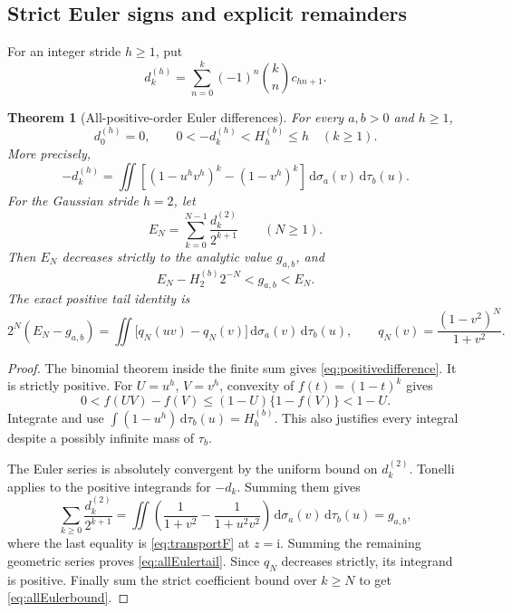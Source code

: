 \documentclass[11pt]{article}
\numberwithin{equation}{section}
\newtheorem{theorem}{Theorem}[section]
\theoremstyle{definition}
\theoremstyle{remark}
\newcommand{\dd}{\,\mathrm d}
\newcommand{\ii}{\mathrm i}
\begin{document}
\subsection{Strict Euler signs and explicit remainders}
For an integer stride $h\ge1$, put
\begin{equation}\label{eq:dk}
 d_k^{(h)}=\sum_{n=0}^k(-1)^n\binom kn c_{hn+1}.
\end{equation}
\begin{theorem}[All-positive-order Euler differences]\label{thm:Eulerall}
For every $a,b>0$ and $h\ge1$,
\begin{equation}\label{eq:differencebound}
 d_0^{(h)}=0,\qquad
 0<-d_k^{(h)}<H_h^{(b)}\le h\quad(k\ge1).
\end{equation}
More precisely,
\begin{equation}\label{eq:positivedifference}
 -d_k^{(h)}=\iint\left[(1-u^hv^h)^k-(1-v^h)^k\right]
                    \dd\sigma_a(v)\dd\tau_b(u).
\end{equation}
For the Gaussian stride $h=2$, let
\begin{equation}\label{eq:EN}
 E_N=\sum_{k=0}^{N-1}\frac{d_k^{(2)}}{2^{k+1}}\qquad(N\ge1).
\end{equation}
Then $E_N$ decreases strictly to the analytic value $g_{a,b}$, and
\begin{equation}\label{eq:allEulerbound}
 E_N-H_2^{(b)}2^{-N}<g_{a,b}<E_N.
\end{equation}
The exact positive tail identity is
\begin{equation}\label{eq:allEulertail}
 2^N(E_N-g_{a,b})
 =\iint\bigl[q_N(uv)-q_N(v)\bigr]
                    \dd\sigma_a(v)\dd\tau_b(u),
 \qquad q_N(v)=\frac{(1-v^2)^N}{1+v^2}.
\end{equation}
\end{theorem}
\begin{proof}
The binomial theorem inside the finite sum gives
\eqref{eq:positivedifference}. It is strictly positive.
For $U=u^h$, $V=v^h$, convexity of $f(t)=(1-t)^k$ gives
\[
 0<f(UV)-f(V)\le(1-U)\{1-f(V)\}<1-U.
\]
Integrate and use
$\int(1-u^h)\dd\tau_b(u)=H_h^{(b)}$. This also justifies every
integral despite a possibly infinite mass of $\tau_b$.

The Euler series is absolutely convergent by the uniform bound on
$d_k^{(2)}$. Tonelli applies to the positive integrands for $-d_k$.
Summing them gives
\[
 \sum_{k\ge0}\frac{d_k^{(2)}}{2^{k+1}}
 =\iint\left(\frac1{1+v^2}-\frac1{1+u^2v^2}\right)
                  \dd\sigma_a(v)\dd\tau_b(u)
 =g_{a,b},
\]
where the last equality is \eqref{eq:transportF} at $z=\ii$.
Summing the remaining geometric series proves
\eqref{eq:allEulertail}. Since $q_N$ decreases strictly, its integrand
is positive. Finally sum the strict coefficient bound over $k\ge N$
to get \eqref{eq:allEulerbound}.
\end{proof}
\end{document}

